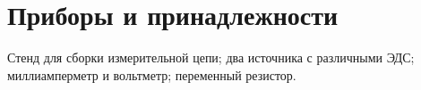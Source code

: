 \section*{Приборы и принадлежности}

Стенд для сборки измерительной цепи; два
источника с различными ЭДС; миллиамперметр и вольтметр; переменный
резистор. 
